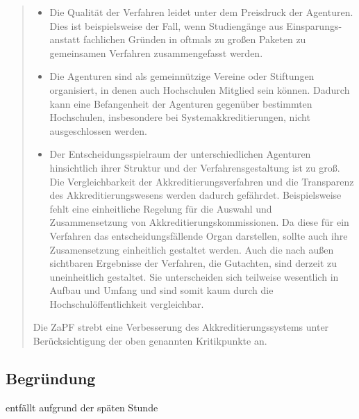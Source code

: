 \documentclass[draft,10pt,oneside]{scrartcl}
\begin{document}
\begin{quote}
	\begin{itemize}
		\item Die Qualität der Verfahren leidet unter dem Preisdruck
			der Agenturen. Dies ist beispielsweise der Fall, wenn
			Studiengänge aus Einsparungs- anstatt fachlichen Gründen in
			oftmals zu großen Paketen zu gemeinsamen Verfahren
			zusammengefasst werden.  
		\item Die Agenturen sind als
			gemeinnützige Vereine oder Stiftungen organisiert, in denen
			auch Hochschulen Mitglied sein können. Dadurch kann eine
			Befangenheit der Agenturen gegenüber bestimmten Hochschulen,
			insbesondere bei Systemakkreditierungen, nicht
			ausgeschlossen werden.  
		\item Der Entscheidungsspielraum der
			unterschiedlichen Agenturen hinsichtlich ihrer Struktur
			und der Verfahrensgestaltung ist zu groß. Die
			Vergleichbarkeit der Akkreditierungsverfahren und die
			Transparenz des Akkreditierungswesens werden dadurch
			gefährdet. Beispielsweise fehlt eine einheitliche
			Regelung für die Auswahl und  Zusammensetzung von
			Akkreditierungskommissionen. Da diese für ein Verfahren
			das entscheidungsfällende Organ darstellen, sollte auch
			ihre Zusamensetzung einheitlich gestaltet werden. Auch
			die nach außen sichtbaren Ergebnisse der Verfahren, die
			Gutachten, sind derzeit zu uneinheitlich gestaltet. Sie
			unterscheiden sich teilweise wesentlich in Aufbau und
			Umfang und sind somit kaum durch die
			Hochschulöffentlichkeit vergleichbar.
	\end{itemize}

	Die ZaPF strebt eine Verbesserung des Akkreditierungssystems unter
	Berücksichtigung der oben genannten Kritikpunkte an.
\end{quote}

\subsection*{Begründung}

entfällt aufgrund der späten Stunde
\end{document}
